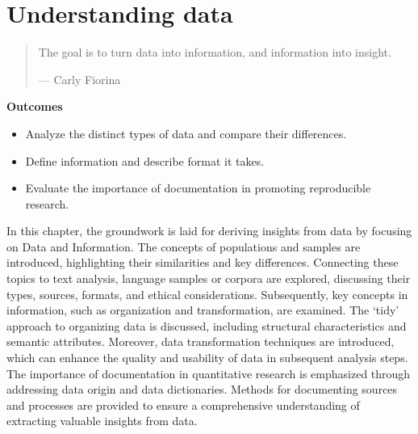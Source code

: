 \documentclass[
  letterpaper,
]{latex/krantz}
\providecommand{\tightlist}{%
  \setlength{\itemsep}{0pt}\setlength{\parskip}{0pt}}\usepackage{longtable,booktabs,array}
\begin{document}
\hypertarget{sec-understanding-data}{%
\chapter{Understanding data}\label{sec-understanding-data}}

\begin{quote}
The goal is to turn data into information, and information into insight.

--- Carly Fiorina
\end{quote}

\begin{tcolorbox}[enhanced jigsaw, left=2mm, arc=.35mm, colback=white, rightrule=.15mm, toprule=.15mm, breakable, leftrule=.75mm, opacityback=0, bottomrule=.15mm]

\textbf{ Outcomes}

\begin{itemize}
\tightlist
\item
  Analyze the distinct types of data and compare their differences.
\item
  Define information and describe format it takes.
\item
  Evaluate the importance of documentation in promoting reproducible
  research.
\end{itemize}

\end{tcolorbox}

In this chapter, the groundwork is laid for deriving insights from data
by focusing on Data and Information. The concepts of populations and
samples are introduced, highlighting their similarities and key
differences. Connecting these topics to text analysis, language samples
or corpora are explored, discussing their types, sources, formats, and
ethical considerations. Subsequently, key concepts in information, such
as organization and transformation, are examined. The `tidy' approach to
organizing data is discussed, including structural characteristics and
semantic attributes. Moreover, data transformation techniques are
introduced, which can enhance the quality and usability of data in
subsequent analysis steps. The importance of documentation in
quantitative research is emphasized through addressing data origin and
data dictionaries. Methods for documenting sources and processes are
provided to ensure a comprehensive understanding of extracting valuable
insights from data.
\end{document}
